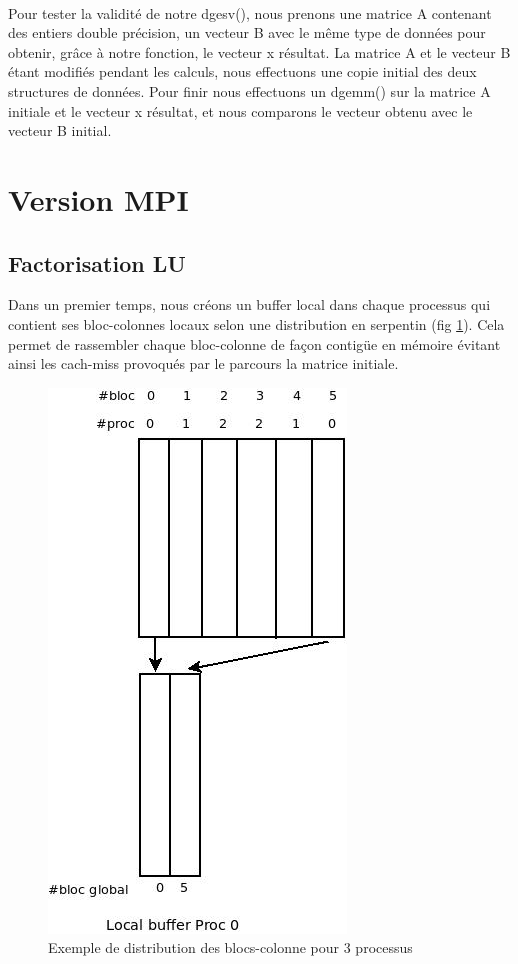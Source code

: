 \documentclass{article}
\begin{document}
\paragraph{}Pour tester la validité de notre dgesv(), nous prenons une matrice A contenant des entiers double précision, un vecteur B avec le même type de données pour obtenir, grâce à notre fonction, le vecteur x résultat. La matrice A et le vecteur B étant modifiés pendant les calculs, nous effectuons une copie initial des deux structures de données. Pour finir nous effectuons un dgemm() sur la matrice A initiale et le vecteur x résultat, et nous comparons le vecteur obtenu avec le vecteur B initial.

\section{Version MPI}
\subsection{Factorisation LU}
Dans un premier temps, nous créons un buffer local dans chaque processus qui contient ses bloc-colonnes locaux selon une distribution en serpentin (fig \ref{diag:serpentin}). Cela permet de rassembler chaque bloc-colonne de façon contigüe en mémoire évitant ainsi les cach-miss provoqués par le parcours la matrice initiale.

\begin{figure}[ht]
  \centering
  \includegraphics[scale=0.5]{pictures/Diagramme_serpentin.jpeg}
  \caption{\label{diag:serpentin} Exemple de distribution des blocs-colonne pour 3 processus}
\end{figure}
\end{document}
